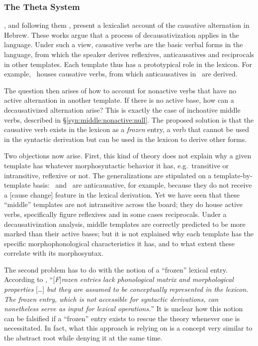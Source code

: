 		\subsubsection{The Theta System \citep{reinhartsiloni05,laks11}}\label{syn:other-stem:reinhart}
\cite{reinhartsiloni05}, and following them \cite{laks11,laks13ws,laks13morpho,laks14}, present a lexicalist account of the causative alternation in Hebrew. These works argue that a process of decausativization applies in the language. Under such a view, causative verbs are the basic verbal forms in the language, from which the speaker derives reflexives, anticausatives and reciprocals in other templates. Each template thus has a prototypical role in the lexicon. For example, \tpie~houses causative verbs, from which anticausatives in \thit~are derived.

The question then arises of how to account for nonactive verbs that have no active alternation in another template. If there is no active base, how can a decausativized alternation arise? This is exactly the case of inchoative middle verbs, described in \S\ref{syn:middle:nonactive:null}. The proposed solution is that the causative verb exists in the lexicon as a \emph{frozen} entry, a verb that cannot be used in the syntactic derivation but can be used in the lexicon to derive other forms.

Two objections now arise. First, this kind of theory does not explain why a given template has whatever morphosyntactic behavior it has, e.g.~transitive or intransitive, reflexive or not. The generalizations are stipulated on a template-by-template basis: \tnif~and \thit~are anticausative, for example, because they do not receive a [cause change] feature in the lexical derivation. Yet we have seen that these ``middle'' templates are not intransitive across the board; they do house active verbs, specifically figure reflexives and in some cases reciprocals. Under a decausativization analysis, middle templates are correctly predicted to be more marked than their active bases; but it is not explained why each template has the specific morphophonological characteristics it has, and to what extent these correlate with its morphosyntax.

The second problem has to do with the notion of a ``frozen'' lexical entry. According to \citet[116]{laks14}, ``[\emph{F}]\emph{rozen entries lack phonological matrix and morphological properties} [\dots] \emph{but they are assumed to be conceptually represented in the lexicon. The frozen entry, which is not accessible for syntactic derivations, can nonetheless serve as input for lexical operations.}'' It is unclear how this notion can be falsified if a ``frozen'' entry exists to rescue the theory whenever one is necessitated. In fact, what this approach is relying on is a concept very similar to the abstract root while denying it at the same time.

